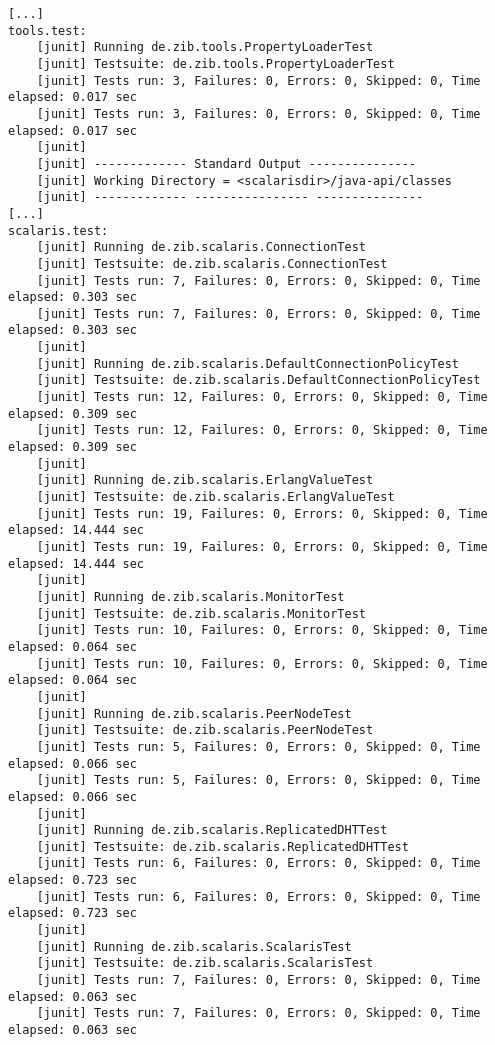 \begin{lstlisting}[language={}]
%> make java-test
[...]
tools.test:
    [junit] Running de.zib.tools.PropertyLoaderTest
    [junit] Testsuite: de.zib.tools.PropertyLoaderTest
    [junit] Tests run: 3, Failures: 0, Errors: 0, Skipped: 0, Time elapsed: 0.017 sec
    [junit] Tests run: 3, Failures: 0, Errors: 0, Skipped: 0, Time elapsed: 0.017 sec
    [junit] 
    [junit] ------------- Standard Output ---------------
    [junit] Working Directory = <scalarisdir>/java-api/classes
    [junit] ------------- ---------------- ---------------
[...]
scalaris.test:
    [junit] Running de.zib.scalaris.ConnectionTest
    [junit] Testsuite: de.zib.scalaris.ConnectionTest
    [junit] Tests run: 7, Failures: 0, Errors: 0, Skipped: 0, Time elapsed: 0.303 sec
    [junit] Tests run: 7, Failures: 0, Errors: 0, Skipped: 0, Time elapsed: 0.303 sec
    [junit] 
    [junit] Running de.zib.scalaris.DefaultConnectionPolicyTest
    [junit] Testsuite: de.zib.scalaris.DefaultConnectionPolicyTest
    [junit] Tests run: 12, Failures: 0, Errors: 0, Skipped: 0, Time elapsed: 0.309 sec
    [junit] Tests run: 12, Failures: 0, Errors: 0, Skipped: 0, Time elapsed: 0.309 sec
    [junit] 
    [junit] Running de.zib.scalaris.ErlangValueTest
    [junit] Testsuite: de.zib.scalaris.ErlangValueTest
    [junit] Tests run: 19, Failures: 0, Errors: 0, Skipped: 0, Time elapsed: 14.444 sec
    [junit] Tests run: 19, Failures: 0, Errors: 0, Skipped: 0, Time elapsed: 14.444 sec
    [junit] 
    [junit] Running de.zib.scalaris.MonitorTest
    [junit] Testsuite: de.zib.scalaris.MonitorTest
    [junit] Tests run: 10, Failures: 0, Errors: 0, Skipped: 0, Time elapsed: 0.064 sec
    [junit] Tests run: 10, Failures: 0, Errors: 0, Skipped: 0, Time elapsed: 0.064 sec
    [junit] 
    [junit] Running de.zib.scalaris.PeerNodeTest
    [junit] Testsuite: de.zib.scalaris.PeerNodeTest
    [junit] Tests run: 5, Failures: 0, Errors: 0, Skipped: 0, Time elapsed: 0.066 sec
    [junit] Tests run: 5, Failures: 0, Errors: 0, Skipped: 0, Time elapsed: 0.066 sec
    [junit] 
    [junit] Running de.zib.scalaris.ReplicatedDHTTest
    [junit] Testsuite: de.zib.scalaris.ReplicatedDHTTest
    [junit] Tests run: 6, Failures: 0, Errors: 0, Skipped: 0, Time elapsed: 0.723 sec
    [junit] Tests run: 6, Failures: 0, Errors: 0, Skipped: 0, Time elapsed: 0.723 sec
    [junit] 
    [junit] Running de.zib.scalaris.ScalarisTest
    [junit] Testsuite: de.zib.scalaris.ScalarisTest
    [junit] Tests run: 7, Failures: 0, Errors: 0, Skipped: 0, Time elapsed: 0.063 sec
    [junit] Tests run: 7, Failures: 0, Errors: 0, Skipped: 0, Time elapsed: 0.063 sec

\end{lstlisting}
